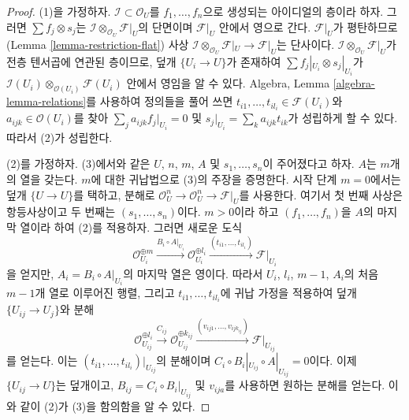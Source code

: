 \begin{proof}
(1)을 가정하자. $\mathcal{I} \subset \mathcal{O}_U$를
$f_1, \ldots, f_n$으로 생성되는 아이디얼의 층이라 하자. 그러면
$\sum f_j \otimes s_j$는
$\mathcal{I} \otimes_{\mathcal{O}_U} \mathcal{F}|_U$의 단면이며
$\mathcal{F}|_U$ 안에서 영으로 간다. $\mathcal{F}|_U$가 평탄하므로(Lemma
\ref{lemma-restriction-flat}) 사상
$\mathcal{I} \otimes_{\mathcal{O}_U} \mathcal{F}|_U \to \mathcal{F}|_U$는
단사이다. $\mathcal{I} \otimes_{\mathcal{O}_U} \mathcal{F}|_U$가 전층
텐서곱에 연관된 층이므로, 덮개 $\{U_i \to U\}$가 존재하여
$\sum f_j|_{U_i} \otimes s_j|_{U_i}$가
$\mathcal{I}(U_i) \otimes_{\mathcal{O}(U_i)} \mathcal{F}(U_i)$ 안에서
영임을 알 수 있다. Algebra, Lemma \ref{algebra-lemma-relations}를 사용하여
정의들을 풀어 쓰면 $t_{i1}, \ldots, t_{i l_i} \in \mathcal{F}(U_i)$와
$a_{ijk} \in \mathcal{O}(U_i)$를 찾아
$\sum_j a_{ijk}f_j|_{U_i} = 0$ 및
$s_j|_{U_i} = \sum_k a_{ijk}t_{ik}$가 성립하게 할 수 있다. 따라서 (2)가
성립한다.

\medskip\noindent
(2)를 가정하자. (3)에서와 같은 $U$, $n$, $m$, $A$ 및
$s_1, \ldots, s_n$이 주어졌다고 하자. $A$는 $m$개의 열을 갖는다. $m$에
대한 귀납법으로 (3)의 주장을 증명한다. 시작 단계 $m = 0$에서는 덮개
$\{U \to U\}$를 택하고, 분해로
$\mathcal{O}_U^n \to \mathcal{O}_U^n \to \mathcal{F}|_U$를 사용한다.
여기서 첫 번째 사상은 항등사상이고 두 번째는
$(s_1, \ldots, s_n)$이다. $m > 0$이라 하고 $(f_1, \ldots, f_n)$을
$A$의 마지막 열이라 하여 (2)를 적용하자. 그러면 새로운 도식
$$
\mathcal{O}_{U_i}^{\oplus m} \xrightarrow{B_i \circ A|_{U_i}}
\mathcal{O}_{U_i}^{\oplus l_i} \xrightarrow{(t_{i1}, \ldots, t_{il_i})}
\mathcal{F}|_{U_i}
$$
을 얻지만, $A_i = B_i \circ A|_{U_i}$의 마지막 열은 영이다. 따라서
$U_i$, $l_i$, $m - 1$, $A_i$의 처음 $m - 1$개 열로 이루어진 행렬, 그리고
$t_{i1}, \ldots, t_{il_i}$에 귀납 가정을 적용하여 덮개
$\{U_{ij} \to U_j\}$와 분해
$$
\mathcal{O}_{U_{ij}}^{\oplus l_i}
\xrightarrow{C_{ij}}
\mathcal{O}_{U_{ij}}^{\oplus k_{ij}}
\xrightarrow{(v_{ij1}, \ldots, v_{ij k_{ij}})}
\mathcal{F}|_{U_{ij}}
$$
를 얻는다. 이는 $(t_{i1}, \ldots, t_{il_i})|_{U_{ij}}$의 분해이며
$C_i \circ B_i|_{U_{ij}} \circ A|_{U_{ij}} = 0$이다. 이제
$\{U_{ij} \to U\}$는 덮개이고,
$B_{ij} = C_i \circ B_i|_{U_{ij}}$ 및 $v_{ija}$를 사용하면 원하는 분해를
얻는다. 이와 같이 (2)가 (3)을 함의함을 알 수 있다.


\end{proof}
